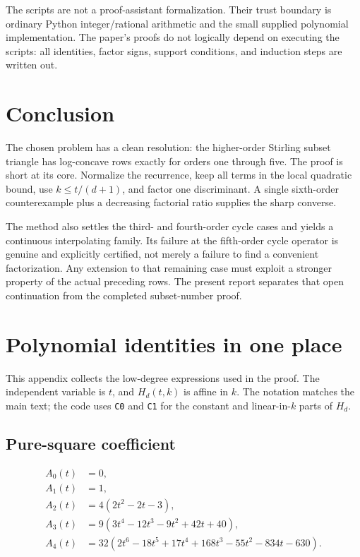 \documentclass[11pt,a4paper]{article}
\numberwithin{equation}{section}
\theoremstyle{definition}
\theoremstyle{remark}
\begin{document}
The scripts are not a proof-assistant formalization. Their trust boundary
is ordinary Python integer/rational arithmetic and the small supplied
polynomial implementation. The paper's proofs do not logically depend on
executing the scripts: all identities, factor signs, support conditions,
and induction steps are written out.

\section{Conclusion}\label{sec:conclusion}

The chosen problem has a clean resolution: the higher-order Stirling
subset triangle has log-concave rows exactly for orders one through five.
The proof is short at its core. Normalize the recurrence, keep all terms
in the local quadratic bound, use $k\le t/(d+1)$, and factor one
discriminant. A single sixth-order counterexample plus a decreasing
factorial ratio supplies the sharp converse.

The method also settles the third- and fourth-order cycle cases and yields
a continuous interpolating family. Its failure at the fifth-order cycle
operator is genuine and explicitly certified, not merely a failure to
find a convenient factorization. Any extension to that remaining case
must exploit a stronger property of the actual preceding rows. The
present report separates that open continuation from the completed
subset-number proof.

\appendix
\section{Polynomial identities in one place}\label{sec:polynomial-table}

This appendix collects the low-degree expressions used in the proof.
The independent variable is $t$, and $H_d(t,k)$ is affine in $k$.
The notation matches the main text; the code uses \texttt{C0} and
\texttt{C1} for the constant and linear-in-$k$ parts of $H_d$.

\subsection{Pure-square coefficient}
\begin{align*}
 A_0(t)&=0,\\
 A_1(t)&=1,\\
 A_2(t)&=4(2t^2-2t-3),\\
 A_3(t)&=9(3t^4-12t^3-9t^2+42t+40),\\
 A_4(t)&=32(2t^6-18t^5+17t^4+168t^3-55t^2-834t-630).
\end{align*}
\end{document}
